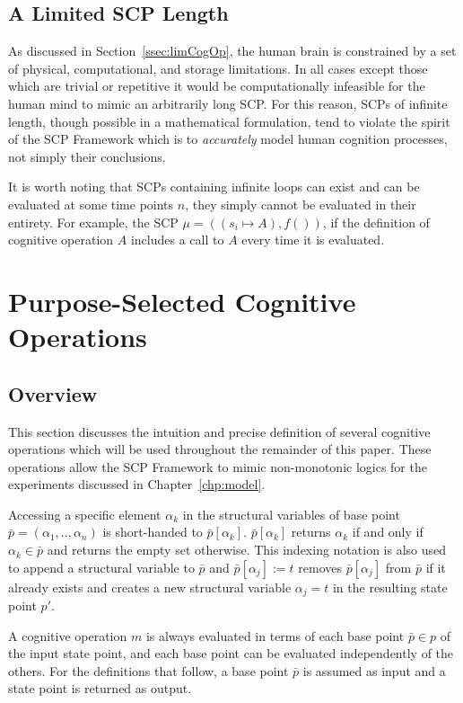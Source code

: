 \subsection{A Limited SCP Length}
As discussed in Section~\ref{ssec:limCogOp}, the human brain is constrained by a set of physical, computational, and storage limitations. In all cases except those which are trivial or repetitive it would be computationally infeasible for the human mind to mimic an arbitrarily long SCP. For this reason, SCPs of infinite length, though possible in a mathematical formulation, tend to violate the spirit of the SCP Framework which is to \textit{accurately} model human cognition processes, not simply their conclusions.

It is worth noting that SCPs containing infinite loops can exist and can be evaluated at some time points $n$, they simply cannot be evaluated in their entirety. For example, the SCP $\mu=((s_i\longmapsto A),f())$, if the definition of cognitive operation $A$ includes a call to $A$ every time it is evaluated. 

\section{Purpose-Selected Cognitive Operations} \label{sec:pso}
\subsection{Overview}

This section discusses the intuition and precise definition of several cognitive operations which will be used throughout the remainder of this paper. These operations allow the SCP Framework to mimic non-monotonic logics for the experiments discussed in Chapter~\ref{chp:model}.

Accessing a specific element $\alpha_k$ in the structural variables of base point $\bar{p}=(\alpha_1,..,\alpha_n)$ is short-handed to $\bar{p}[\alpha_k]$. $\bar{p}[\alpha_k]$ returns $\alpha_k$ if and only if $\alpha_k \in \bar{p}$ and returns the empty set otherwise. This indexing notation is also used to append a structural variable to $\bar{p}$ and $\bar{p}[\alpha_j]:=t$ removes $\bar{p}[\alpha_j]$ from $\bar{p}$ if it already exists and creates a new structural variable $\alpha_j=t$ in the resulting state point $p'$.

A cognitive operation $m$ is always evaluated in terms of each base point $\bar{p} \in p$ of the input state point, and each base point can be evaluated independently of the others. For the definitions that follow, a base point $\bar{p}$ is assumed as input and a state point is returned as output. 

